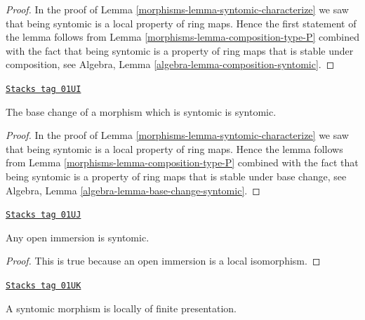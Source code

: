 \begin{proof}

In the proof of Lemma \ref{morphisms-lemma-syntomic-characterize}
we saw that being syntomic is a local property of ring maps.
Hence the first statement of the lemma follows from
Lemma \ref{morphisms-lemma-composition-type-P} combined
with the fact that being syntomic is a property of ring maps that is
stable under composition, see
Algebra, Lemma \ref{algebra-lemma-composition-syntomic}.
\end{proof}

\begin{lemma}
\label{morphisms-lemma-base-change-syntomic}
\href{https://stacks.math.columbia.edu/tag/01UI}{\texttt{Stacks tag 01UI}}

The base change of a morphism which is syntomic is syntomic.
\end{lemma}

\begin{proof}

In the proof of Lemma \ref{morphisms-lemma-syntomic-characterize}
we saw that being syntomic is a local property of ring maps.
Hence the lemma follows from
Lemma \ref{morphisms-lemma-composition-type-P} combined
with the fact that being syntomic is a property of ring maps that is
stable under base change, see
Algebra, Lemma \ref{algebra-lemma-base-change-syntomic}.
\end{proof}

\begin{lemma}
\label{morphisms-lemma-open-immersion-syntomic}
\href{https://stacks.math.columbia.edu/tag/01UJ}{\texttt{Stacks tag 01UJ}}

Any open immersion is syntomic.
\end{lemma}

\begin{proof}
This is true because an open immersion is a local isomorphism.
\end{proof}

\begin{lemma}
\label{morphisms-lemma-syntomic-locally-finite-presentation}
\href{https://stacks.math.columbia.edu/tag/01UK}{\texttt{Stacks tag 01UK}}

A syntomic morphism is locally of finite presentation.
\end{lemma}

